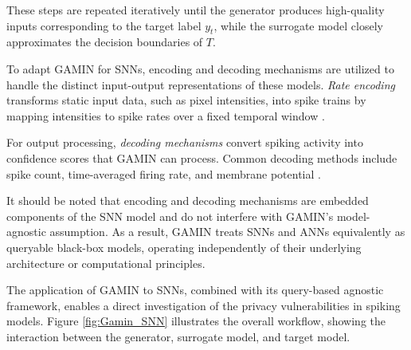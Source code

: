 \noindent
These steps are repeated iteratively until the generator produces high-quality inputs corresponding to the target label $y_t$, while the surrogate model closely approximates the decision boundaries of $T$.

To adapt GAMIN for SNNs, encoding and decoding mechanisms are utilized to handle the distinct input-output representations of these models. \textit{Rate encoding} transforms static input data, such as pixel intensities, into spike trains by mapping intensities to spike rates over a fixed temporal window  \cite{auge2021survey}. 

For output processing, \textit{decoding mechanisms} convert spiking activity into confidence scores that GAMIN can process. Common decoding methods include spike count, time-averaged firing rate, and membrane potential \cite{eshraghian2023training}.

It should be noted that encoding and decoding mechanisms are embedded components of the SNN model and do not interfere with GAMIN’s model-agnostic assumption. As a result, GAMIN treats SNNs and ANNs equivalently as queryable black-box models, operating independently of their underlying architecture or computational principles.

The application of GAMIN to SNNs, combined with its query-based agnostic framework, enables a direct investigation of the privacy vulnerabilities in spiking models. Figure \ref{fig:Gamin_SNN} illustrates the overall workflow, showing the interaction between the generator, surrogate model, and target model.




